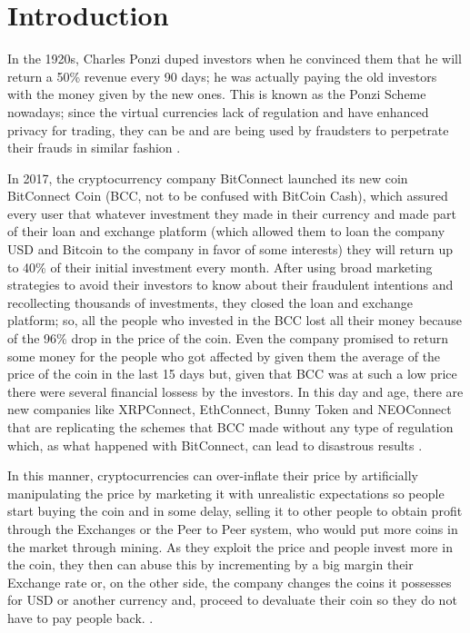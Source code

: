 \section{Introduction}
In the 1920s, Charles Ponzi duped investors when he convinced them that he will return a 50\% revenue every 90 days; he was actually paying the old investors with the money given by the new ones. This is known as the Ponzi Scheme nowadays; since the virtual currencies lack of regulation and have enhanced privacy for trading, they can be and are being used by fraudsters to perpetrate their frauds in similar fashion \cite{ponzi}.

\noindent In 2017, the cryptocurrency company BitConnect launched its new coin BitConnect Coin (BCC, not to be confused with BitCoin Cash), which assured every user that whatever investment they made in their currency and made part of their loan and exchange platform (which allowed them to loan the company USD and Bitcoin to the company in favor of some interests) they will return up to 40\% of their initial investment every month. After using broad marketing strategies to avoid their investors to know about their fraudulent intentions and recollecting thousands of investments, they closed the loan and exchange platform; so, all the people who invested in the BCC lost all their money because of the 96\% drop in the price of the coin. Even the company promised to return some money for the people who got affected by given them the average of the price of the coin in the last 15 days but, given that BCC was at such a low price there were several financial lossess by the investors. In this day and age, there are new companies like XRPConnect, EthConnect, Bunny Token and NEOConnect that are replicating the schemes that BCC made without any type of regulation which, as what happened with BitConnect, can lead to disastrous results \cite{nextWeb}.

\noindent In this manner, cryptocurrencies can over-inflate their price by artificially manipulating the price by marketing it with unrealistic expectations so people start buying the coin and in some delay, selling it to other people to obtain profit through the Exchanges or the Peer to Peer system, who would put more coins in the market through mining. As they exploit the price and people invest more in the coin, they then can abuse this by incrementing by a big margin their Exchange rate or, on the other side, the company changes the coins it possesses for USD or another currency and, proceed to devaluate their coin so they do not have to pay people back. \cite{bcc11}.

